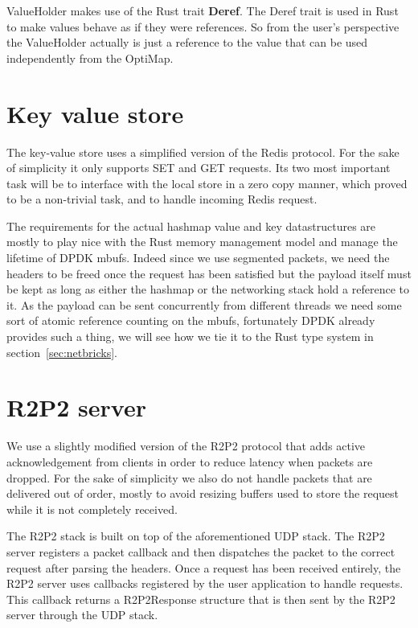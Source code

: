 ValueHolder makes use of the Rust trait \textbf{Deref}. The Deref
trait is used in Rust to make values behave as if they were
references. So from the user's perspective the ValueHolder actually is
just a reference to the value that can be used independently from the
OptiMap.

\section{Key value store}

The key-value store uses a simplified version of the Redis
protocol. For the sake of simplicity it only supports SET and GET
requests. Its two most important task will be to interface with the
local store in a zero copy manner, which proved to be a non-trivial
task, and to handle incoming Redis request.

The requirements for the actual hashmap value and key datastructures
are mostly to play nice with the Rust memory management model and
manage the lifetime of DPDK mbufs. Indeed since we use segmented
packets, we need the headers to be freed once the request has been
satisfied but the payload itself must be kept as long as either the
hashmap or the networking stack hold a reference to it. As the payload
can be sent concurrently from different threads we need some sort of
atomic reference counting on the mbufs, fortunately DPDK already
provides such a thing, we will see how we tie it to the Rust type
system in section~\ref{sec:netbricks}.



\section{R2P2 server}

We use a slightly modified version of the R2P2 protocol that adds
active acknowledgement from clients in order to reduce latency when
packets are dropped. For the sake of simplicity we also do not handle
packets that are delivered out of order, mostly to avoid resizing
buffers used to store the request while it is not completely
received.

The R2P2 stack is built on top of the aforementioned UDP stack. The
R2P2 server registers a packet callback and then dispatches the packet
to the correct request after parsing the headers. Once a request has
been received entirely, the R2P2 server uses callbacks registered by
the user application to handle requests. This callback returns a
R2P2Response structure that is then sent by the R2P2 server through
the UDP stack.

